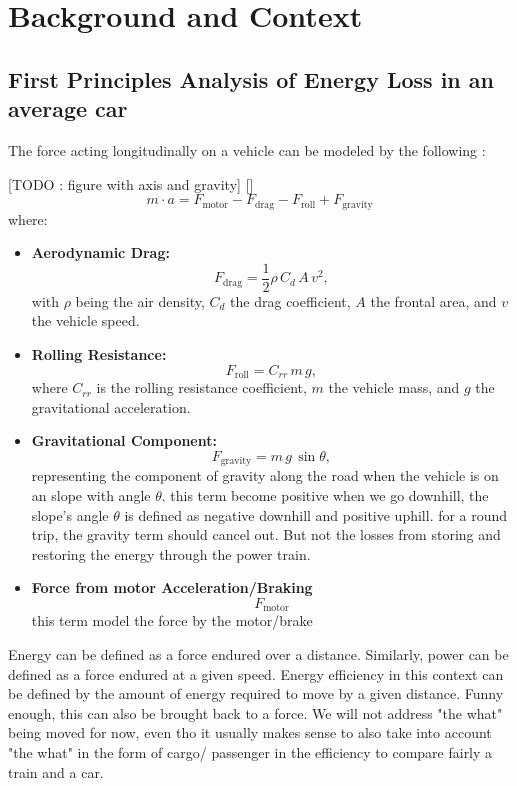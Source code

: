 \section{Background and Context}

\subsection{First Principles Analysis of Energy Loss in an average car}
The force acting longitudinally on a vehicle can be modeled by the following : 

[TODO : figure with axis and gravity]
[]
\[
m\cdot a = F_{\text{motor}} - F_{\text{drag}} - F_{\text{roll}} + F_{\text{gravity}}
\]
where:
\begin{itemize}
    \item \textbf{Aerodynamic Drag:} 
    \[
    F_{\text{drag}} = \frac{1}{2} \rho\, C_d\, A\, v^2,
    \]
    with \(\rho\) being the air density, \(C_d\) the drag coefficient, \(A\) the frontal area, and \(v\) the vehicle speed.
    \item \textbf{Rolling Resistance:} 
    \[
    F_{\text{roll}} = C_{rr}\, m\, g,
    \]
    where \(C_{rr}\) is the rolling resistance coefficient, \(m\) the vehicle mass, and \(g\) the gravitational acceleration.
    \item \textbf{Gravitational Component:} 
    \[
    F_{\text{gravity}} = m\, g\, \sin\theta,
    \]
    representing the component of gravity along the road when the vehicle is on an slope with angle \(\theta\). this term become positive when we go downhill, the slope's angle $\theta$ is defined as negative downhill and positive uphill. for a round trip, the gravity term should cancel out. But not the losses from storing and restoring the energy through the power train.
    \item \textbf{Force from motor Acceleration/Braking} 
    \[
    F_{\text{motor}}
    \]
    this term model the force by the motor/brake
\end{itemize}

Energy can be defined as a force endured over a distance. Similarly, power can be defined as a force endured at a given speed. Energy efficiency in this context can be defined by the amount of energy required to move by a given distance. Funny enough, this can also be brought back to a force. We will not address "the what" being moved for now, even tho it usually makes sense to also take into account "the what" in the form of cargo/ passenger in the efficiency to compare fairly a train and a car.

